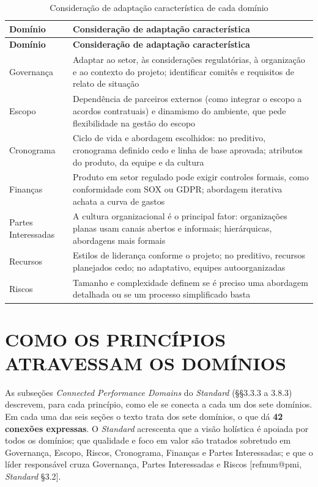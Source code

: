 \documentclass[12pt,a4paper,article,oneside,english,brazil]{abntex2}
\makeatletter
\newcommand{\fontetab}[1]{\par\vspace{3pt}{\small\noindent Fonte: #1\par}}
\newcommand{\refnum}[1]{\csname refnum@#1\endcsname}
\newcommand{\cit}[1]{[\refnum{#1}]}
\makeatother
\begin{document}
\begingroup\SingleSpacing\small
\begin{longtable}{@{}>{\raggedright\arraybackslash}p{}>{\raggedright\arraybackslash}p{}@{}}
\caption{Consideração de adaptação característica de cada domínio}\label{tab:t9}\\
\hline
\textbf{Domínio} & \textbf{Consideração de adaptação característica}\\
\hline
\endfirsthead
\hline
\textbf{Domínio} & \textbf{Consideração de adaptação característica}\\
\hline
\endhead
\hline
\endfoot
\hline
\endlastfoot
Governança & Adaptar ao setor, às considerações regulatórias, à organização e ao contexto do projeto; identificar comitês e requisitos de relato de situação\\[3pt]
Escopo & Dependência de parceiros externos (como integrar o escopo a acordos contratuais) e dinamismo do ambiente, que pede flexibilidade na gestão do escopo\\[3pt]
Cronograma & Ciclo de vida e abordagem escolhidos: no preditivo, cronograma definido cedo e linha de base aprovada; atributos do produto, da equipe e da cultura\\[3pt]
Finanças & Produto em setor regulado pode exigir controles formais, como conformidade com SOX ou GDPR; abordagem iterativa achata a curva de gastos\\[3pt]
Partes Interessadas & A cultura organizacional é o principal fator: organizações planas usam canais abertos e informais; hierárquicas, abordagens mais formais\\[3pt]
Recursos & Estilos de liderança conforme o projeto; no preditivo, recursos planejados cedo; no adaptativo, equipes autoorganizadas\\[3pt]
Riscos & Tamanho e complexidade definem se é preciso uma abordagem detalhada ou se um processo simplificado basta\\[3pt]
\end{longtable}
\endgroup
\fontetab{Elaborado pelos autores (2026), com base em \cit{pmi}.}

\section{COMO OS PRINCÍPIOS ATRAVESSAM OS DOMÍNIOS}

As subseções \textit{Connected Performance Domains} do \textit{Standard} (§§3.3.3 a 3.8.3) descrevem, para cada princípio, como ele se conecta a cada um dos sete domínios. Em cada uma das seis seções o texto trata dos sete domínios, o que dá \textbf{42 conexões expressas}. O \textit{Standard} acrescenta que a visão holística é apoiada por todos os domínios; que qualidade e foco em valor são tratados sobretudo em Governança, Escopo, Riscos, Cronograma, Finanças e Partes Interessadas; e que o líder responsável cruza Governança, Partes Interessadas e Riscos [\refnum{pmi}, \textit{Standard} §3.2].
\end{document}
